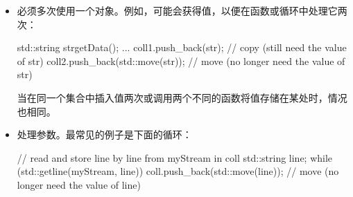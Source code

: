 \begin{itemize}
	\item 必须多次使用一个对象。例如，可能会获得值，以便在函数或循环中处理它两次：

	\begin{cppcode}
std::string str{getData()};
...
coll1.push_back(str); // copy (still need the value of str)
coll2.push_back(std::move(str)); // move (no longer need the value of str)
	\end{cppcode}
	当在同一个集合中插入值两次或调用两个不同的函数将值存储在某处时，情况也相同。
	\item 处理参数。最常见的例子是下面的循环：

	\begin{cppcode}
// read and store line by line from myStream in coll
std::string line;
while (std::getline(myStream, line)) {
	coll.push_back(std::move(line)); // move (no longer need the value of line)
}
	\end{cppcode}
\end{itemize}








